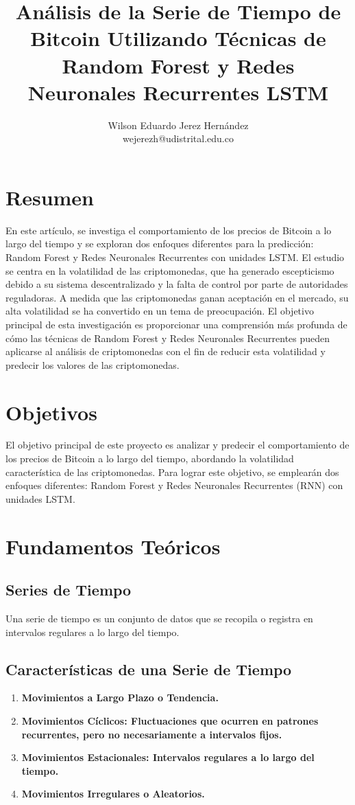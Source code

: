 \documentclass[final, 20pt, a2paper, portrait]{extarticle}
\title{Análisis de la Serie de Tiempo de Bitcoin Utilizando Técnicas de Random Forest y Redes Neuronales Recurrentes LSTM}
\author{Wilson Eduardo Jerez Hernández\\wejerezh@udistrital.edu.co}
\date{}
\begin{document}
\section*{}
\vspace{4cm}
\section*{Resumen}
En este artículo, se investiga el comportamiento de los precios de Bitcoin a lo largo del tiempo y se exploran dos enfoques diferentes para la predicción: Random Forest y Redes Neuronales Recurrentes con unidades LSTM. El estudio se centra en la volatilidad de las criptomonedas, que ha generado escepticismo debido a su sistema descentralizado y la falta de control por parte de autoridades reguladoras. A medida que las criptomonedas ganan aceptación en el mercado, su alta volatilidad se ha convertido en un tema de preocupación. El objetivo principal de esta investigación es proporcionar una comprensión más profunda de cómo las técnicas de Random Forest y Redes Neuronales Recurrentes pueden aplicarse al análisis de criptomonedas con el fin de reducir esta volatilidad y predecir los valores de las criptomonedas.

\section*{Objetivos}
El objetivo principal de este proyecto es analizar y predecir el comportamiento de los precios de Bitcoin a lo largo del tiempo, abordando la volatilidad característica de las criptomonedas. Para lograr este objetivo, se emplearán dos enfoques diferentes: Random Forest y Redes Neuronales Recurrentes (RNN) con unidades LSTM.

\section*{Fundamentos Teóricos}
\subsection*{Series de Tiempo}
Una serie de tiempo es un conjunto de datos que se recopila o registra en intervalos regulares a lo largo del tiempo.
\subsection*{Características de una Serie de Tiempo}
\begin{enumerate}
    \item \textbf{Movimientos a Largo Plazo o Tendencia.}
    \item \textbf{Movimientos Cíclicos: Fluctuaciones que ocurren en patrones recurrentes, pero no necesariamente a intervalos fijos.}
    \item \textbf{Movimientos Estacionales: Intervalos regulares a lo largo del tiempo.}
    \item \textbf{Movimientos Irregulares o Aleatorios.}
\end{enumerate}
\end{document}
